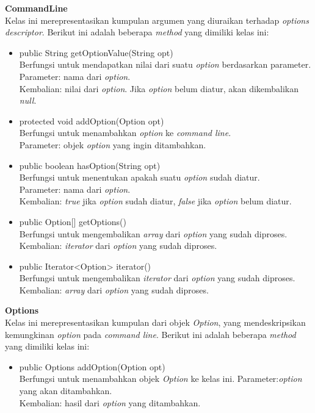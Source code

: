 \documentclass[a4paper,twoside]{article}
\begin{document}
\begin{enumerate}
\textbf{CommandLine}\\
Kelas ini merepresentasikan kumpulan argumen yang diuraikan terhadap \textit{options descriptor}.
Berikut ini adalah beberapa \textit{method} yang dimiliki kelas ini: 
\begin{itemize}
\item public String getOptionValue(String opt)\\
Berfungsi untuk mendapatkan nilai dari suatu \textit{option} berdasarkan parameter.\\
Parameter: nama dari \textit{option}.\\
Kembalian: nilai dari \textit{option}. Jika \textit{option} belum diatur, akan dikembalikan \textit{null}.
\item protected void addOption(Option opt)\\
Berfungsi untuk menambahkan \textit{option} ke \textit{command line}.\\
Parameter: objek \textit{option} yang ingin ditambahkan.
\item public boolean hasOption(String opt)\\
Berfungsi untuk menentukan apakah suatu \textit{option} sudah diatur.\\
Parameter: nama dari \textit{option}.\\
Kembalian: \textit{true} jika \textit{option} sudah diatur, \textit{false} jika \textit{option} belum diatur.
\item public Option[] getOptions()\\
Berfungsi untuk mengembalikan \textit{array} dari \textit{option} yang sudah diproses.\\ 
Kembalian: \textit{iterator} dari \textit{option} yang sudah diproses.
\item public Iterator<Option> iterator()\\
Berfungsi untuk mengembalikan \textit{iterator} dari \textit{option} yang sudah diproses.\\ 
Kembalian: \textit{array} dari \textit{option} yang sudah diproses.

\end{itemize}

\textbf{Options}\\
Kelas ini merepresentasikan kumpulan dari objek \textit{Option}, yang mendeskripsikan kemungkinan \textit{option} pada \textit{command line}. Berikut ini adalah beberapa \textit{method} yang dimiliki kelas ini: 
\begin{itemize}
\item public Options addOption(Option opt)\\
Berfungsi untuk menambahkan objek \textit{Option} ke kelas ini.
Parameter:\textit{option} yang akan ditambahkan.\\
Kembalian: hasil dari \textit{option} yang ditambahkan.


\end{itemize}
\end{enumerate}
\end{document}
